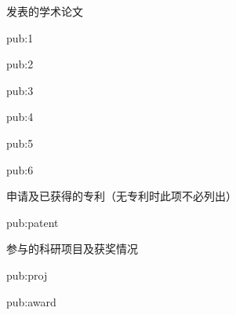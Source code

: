 \begin{achievements}[pub]
  \begin{pubgroup}{发表的学术论文}
    \item{pub:1}
    \item{pub:2}
    \item{pub:3}
    \item{pub:4}
    \item{pub:5}
    \item{pub:6}
  \end{pubgroup}
  \begin{pubgroup}{申请及已获得的专利（无专利时此项不必列出）}
    \item{pub:patent}
  \end{pubgroup}
  \begin{pubgroup}{参与的科研项目及获奖情况}
    \item{pub:proj}
    \item{pub:award}
  \end{pubgroup}
\end{achievements}
